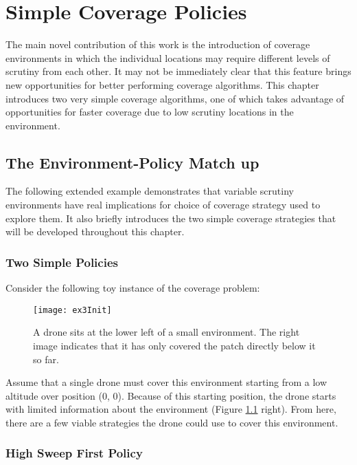 \chapter{Simple Coverage Policies}

The main novel contribution of this work is the introduction of coverage environments in which the individual locations may require different levels of scrutiny from each other. It may not be immediately clear that this feature brings new opportunities for better performing coverage algorithms. This chapter introduces two very simple coverage algorithms, one of which takes advantage of opportunities for faster coverage due to low scrutiny locations in the environment.

\section{The Environment-Policy Match up}

The following extended example demonstrates that variable scrutiny environments have real implications for choice of coverage strategy used to explore them. It also briefly introduces the two simple coverage strategies that will be developed throughout this chapter.

\subsection{Two Simple Policies}

Consider the following toy instance of the coverage problem:

\begin{figure}[H]
\texttt{[image: ex3Init]}
\caption[Tiny Square Environment]{A drone sits at the lower left of a small environment. The right image indicates that it has only covered the patch directly below it so far.}
\label{fig:ex3-1-start}
\end{figure}

Assume that a single drone must cover this environment starting from a low altitude over position (0, 0). Because of this starting position, the drone starts with limited information about the environment (Figure \ref{fig:ex3-1-start} right). From here, there are a few viable strategies the drone could use to cover this environment.

\subsection{High Sweep First Policy}

